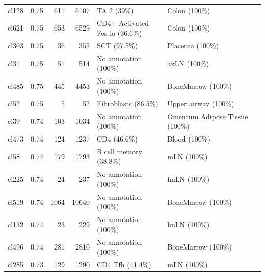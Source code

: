 \begin{table}[ht!]
\begin{tabular}{lrrrll}
  cl128 & 0.75 & 611 & 6107 & TA 2 (39\%) & Colon (100\%) \\ 
  cl621 & 0.75 & 653 & 6529 & \specialcell[t]{CD4+ Activated\\Fos-lo (36.6\%)} & Colon (100\%) \\ 
  cl303 & 0.75 &  36 & 355 & SCT (97.5\%) & Placenta (100\%) \\ 
  cl31 & 0.75 &  51 & 514 & No annotation (100\%) & axLN (100\%) \\ 
  cl485 & 0.75 & 445 & 4453 & No annotation (100\%) & BoneMarrow (100\%) \\ 
  cl52 & 0.75 &   5 &  52 & Fibroblasts (86.5\%) & Upper airway (100\%) \\ 
  cl39 & 0.74 & 103 & 1034 & No annotation (100\%) & Omentum Adipose Tissue (100\%) \\ 
  cl473 & 0.74 & 124 & 1237 & CD4 (46.6\%) & Blood (100\%) \\ 
  cl58 & 0.74 & 179 & 1793 & B cell memory (38.8\%) & mLN (100\%) \\ 
  cl225 & 0.74 &  24 & 237 & No annotation (100\%) & hnLN (100\%) \\ 
  cl519 & 0.74 & 1064 & 10640 & No annotation (100\%) & BoneMarrow (100\%) \\ 
  cl132 & 0.74 &  23 & 229 & No annotation (100\%) & hnLN (100\%) \\ 
  cl496 & 0.74 & 281 & 2810 & No annotation (100\%) & BoneMarrow (100\%) \\ 
  cl285 & 0.73 & 129 & 1290 & CD4 Tfh (41.4\%) & mLN (100\%) \\ 
   \bottomrule
\end{tabular}
\end{table}  
  
